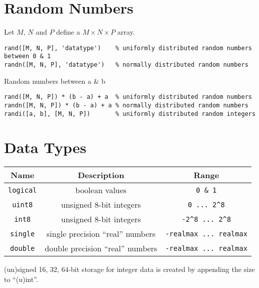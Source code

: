 \documentclass{article}
\begin{document}
\lstset{language=Matlab, upquote=true}

\lstset{
    basicstyle = \ttfamily, columns = fullflexible, keepspaces = true
}

\section*{Random Numbers}
Let $M$, $N$ and $P$ define a $M\times N\times P$ array.
\begin{lstlisting}
rand([M, N, P], 'datatype')    % uniformly distributed random numbers between 0 & 1
randn([M, N, P], 'datatype')   % normally distributed random numbers
\end{lstlisting}
Random numbers between a \& b
\begin{lstlisting}
rand([M, N, P]) * (b - a) + a  % uniformly distributed random numbers
randn([M, N, P]) * (b - a) + a % normally distributed random numbers
randi([a, b], [M, N, P])       % uniformly distributed random integers
\end{lstlisting}
\section*{Data Types}
\begin{table}[H]
    \centering
    \begin{tabular}{c | c | c}
        \toprule
        \textbf{Name} & \textbf{Description} & \textbf{Range} \\
        \midrule
        \lstinline!logical! & boolean values                   & \lstinline!0 & 1! \\
        \lstinline!uint8!   & unsigned 8-bit integers          & \lstinline!0 ... 2^8! \\
        \lstinline!int8!    & unsigned 8-bit integers          & \lstinline!-2^8 ... 2^8! \\
        \lstinline!single!  & single precision ``real'' numbers & \lstinline!-realmax ... realmax! \\
        \lstinline!double!  & double precision ``real'' numbers & \lstinline!-realmax ... realmax! \\
        \bottomrule
    \end{tabular}
\end{table}
(un)signed 16, 32, 64-bit storage for integer data is created by appending the size to ``(u)int''.
\end{document}
